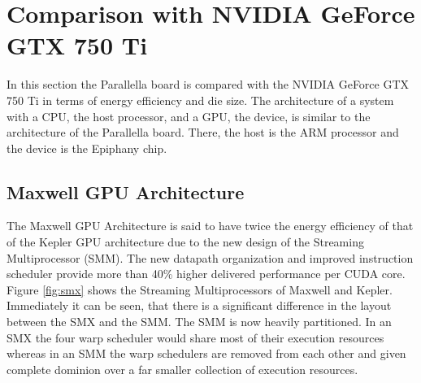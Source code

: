 \documentclass[american, hauptseminar, twoside]{zihpub}
\begin{document}
	\section{Comparison with NVIDIA GeForce GTX 750 Ti}
		\label{sec:gpu}
		In this section the Parallella board is compared with the NVIDIA GeForce GTX 750 Ti in terms of energy efficiency and die size. The architecture of a system with a CPU, the host processor, and a GPU, the device, is similar to the architecture of the Parallella board. There, the host is the ARM processor and the device is the Epiphany chip. 
		\subsection{Maxwell GPU Architecture}
			The Maxwell GPU Architecture is said to have twice the energy efficiency of that of the Kepler GPU architecture due to the new design of the Streaming Multiprocessor (SMM). The new datapath organization and improved instruction scheduler provide more than 40\% higher delivered performance per CUDA core. Figure \ref{fig:smx} shows the Streaming Multiprocessors of Maxwell and Kepler. Immediately it can be seen, that there is a significant difference in the layout between the SMX and the SMM. The SMM is now heavily partitioned. In an SMX the four warp scheduler would share most of their execution resources whereas in an SMM the warp schedulers are removed from each other and given complete dominion over a far smaller collection of execution resources. 
\end{document}
